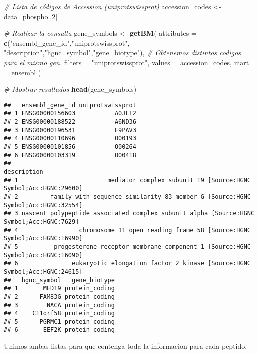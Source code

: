 \documentclass[
]{article}
\newenvironment{Shaded}{\begin{snugshade}}{\end{snugshade}}
\newcommand{\AttributeTok}[1]{\textcolor[rgb]{0.13,0.29,0.53}{#1}}
\newcommand{\CommentTok}[1]{\textcolor[rgb]{0.56,0.35,0.01}{\textit{#1}}}
\newcommand{\DecValTok}[1]{\textcolor[rgb]{0.00,0.00,0.81}{#1}}
\newcommand{\FunctionTok}[1]{\textcolor[rgb]{0.13,0.29,0.53}{\textbf{#1}}}
\newcommand{\NormalTok}[1]{#1}
\newcommand{\OtherTok}[1]{\textcolor[rgb]{0.56,0.35,0.01}{#1}}
\newcommand{\StringTok}[1]{\textcolor[rgb]{0.31,0.60,0.02}{#1}}
\begin{document}
\begin{Shaded}
\begin{Highlighting}[]
\CommentTok{\# Lista de códigos de Accession (uniprotswissprot)}
\NormalTok{accession\_codes }\OtherTok{\textless{}{-}}\NormalTok{ data\_phospho[,}\DecValTok{2}\NormalTok{]}

\CommentTok{\# Realizar la consulta}
\NormalTok{gene\_symbols }\OtherTok{\textless{}{-}} \FunctionTok{getBM}\NormalTok{(}
  \AttributeTok{attributes =} \FunctionTok{c}\NormalTok{(}\StringTok{"ensembl\_gene\_id"}\NormalTok{,}\StringTok{"uniprotswissprot"}\NormalTok{, }\StringTok{"description"}\NormalTok{,}\StringTok{"hgnc\_symbol"}\NormalTok{,}\StringTok{"gene\_biotype"}\NormalTok{), }\CommentTok{\# Obtenemos distintos codigos para el mismo gen.}
  \AttributeTok{filters =} \StringTok{"uniprotswissprot"}\NormalTok{,}
  \AttributeTok{values =}\NormalTok{ accession\_codes,}
  \AttributeTok{mart =}\NormalTok{ ensembl}
\NormalTok{)}

\CommentTok{\# Mostrar resultados}
\FunctionTok{head}\NormalTok{(gene\_symbols)}
\end{Highlighting}
\end{Shaded}

\begin{verbatim}
##   ensembl_gene_id uniprotswissprot
## 1 ENSG00000156603           A0JLT2
## 2 ENSG00000188522           A6ND36
## 3 ENSG00000196531           E9PAV3
## 4 ENSG00000110696           O00193
## 5 ENSG00000101856           O00264
## 6 ENSG00000103319           O00418
##                                                                               description
## 1                         mediator complex subunit 19 [Source:HGNC Symbol;Acc:HGNC:29600]
## 2         family with sequence similarity 83 member G [Source:HGNC Symbol;Acc:HGNC:32554]
## 3 nascent polypeptide associated complex subunit alpha [Source:HGNC Symbol;Acc:HGNC:7629]
## 4                 chromosome 11 open reading frame 58 [Source:HGNC Symbol;Acc:HGNC:16990]
## 5          progesterone receptor membrane component 1 [Source:HGNC Symbol;Acc:HGNC:16090]
## 6               eukaryotic elongation factor 2 kinase [Source:HGNC Symbol;Acc:HGNC:24615]
##   hgnc_symbol   gene_biotype
## 1       MED19 protein_coding
## 2      FAM83G protein_coding
## 3        NACA protein_coding
## 4    C11orf58 protein_coding
## 5      PGRMC1 protein_coding
## 6       EEF2K protein_coding
\end{verbatim}

Unimos ambas listas para que contenga toda la informacion para cada
peptido.
\end{document}
